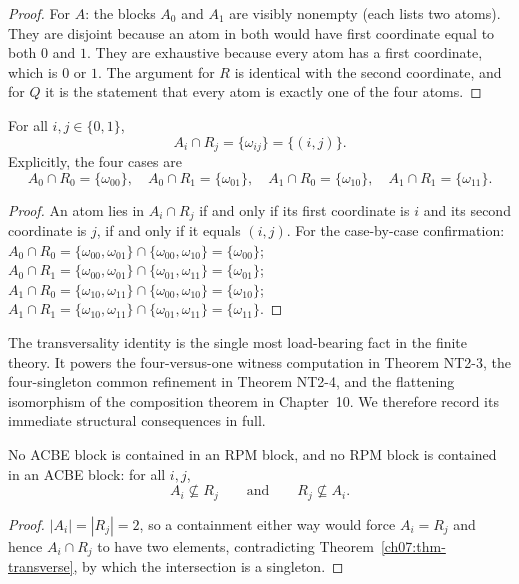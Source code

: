 \begin{proof}
For $A$: the blocks $A_{0}$ and $A_{1}$ are visibly nonempty (each lists two atoms). They are disjoint because an atom in both would have first coordinate equal to both $0$ and $1$. They are exhaustive because every atom has a first coordinate, which is $0$ or $1$. The argument for $R$ is identical with the second coordinate, and for $Q$ it is the statement that every atom is exactly one of the four atoms.
\end{proof}

\begin{theorem}\label{ch07:thm-transverse}
For all $i,j\in\{0,1\}$,
\[
A_{i}\cap R_{j}=\{\omega_{ij}\}=\{(i,j)\}.
\]
Explicitly, the four cases are
\[
A_{0}\cap R_{0}=\{\omega_{00}\},\quad
A_{0}\cap R_{1}=\{\omega_{01}\},\quad
A_{1}\cap R_{0}=\{\omega_{10}\},\quad
A_{1}\cap R_{1}=\{\omega_{11}\}.
\]
\end{theorem}

\begin{proof}
An atom lies in $A_{i}\cap R_{j}$ if and only if its first coordinate is $i$ and its second coordinate is $j$, if and only if it equals $(i,j)$. For the case-by-case confirmation: $A_{0}\cap R_{0}=\{\omega_{00},\omega_{01}\}\cap\{\omega_{00},\omega_{10}\}=\{\omega_{00}\}$; $A_{0}\cap R_{1}=\{\omega_{00},\omega_{01}\}\cap\{\omega_{01},\omega_{11}\}=\{\omega_{01}\}$; $A_{1}\cap R_{0}=\{\omega_{10},\omega_{11}\}\cap\{\omega_{00},\omega_{10}\}=\{\omega_{10}\}$; $A_{1}\cap R_{1}=\{\omega_{10},\omega_{11}\}\cap\{\omega_{01},\omega_{11}\}=\{\omega_{11}\}$.
\end{proof}

The transversality identity is the single most load-bearing fact in the finite theory. It powers the four-versus-one witness computation in Theorem NT2-3, the four-singleton common refinement in Theorem NT2-4, and the flattening isomorphism of the composition theorem in Chapter~10. We therefore record its immediate structural consequences in full.

\begin{corollary}\label{ch07:cor-no-containment}
No ACBE block is contained in an RPM block, and no RPM block is contained in an ACBE block: for all $i,j$,
\[
A_{i}\not\subseteq R_{j}
\qquad\text{and}\qquad
R_{j}\not\subseteq A_{i}.
\]
\end{corollary}

\begin{proof}
$|A_{i}|=|R_{j}|=2$, so a containment either way would force $A_{i}=R_{j}$ and hence $A_{i}\cap R_{j}$ to have two elements, contradicting Theorem~\ref{ch07:thm-transverse}, by which the intersection is a singleton.
\end{proof}

